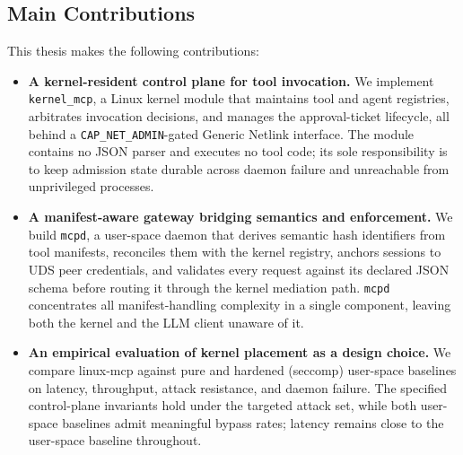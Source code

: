 \subsection{Main Contributions}
This thesis makes the following contributions:
\begin{itemize}
    \item \textbf{A kernel-resident control plane for tool invocation.}
    We implement \texttt{kernel\_\allowbreak mcp}, a Linux kernel module that maintains tool and agent registries, arbitrates invocation decisions, and manages the approval-ticket lifecycle, all behind a \texttt{CAP\_\allowbreak NET\_\allowbreak ADMIN}-gated Generic Netlink interface.
    The module contains no JSON parser and executes no tool code; its sole responsibility is to keep admission state durable across daemon failure and unreachable from unprivileged processes.

    \item \textbf{A manifest-aware gateway bridging semantics and enforcement.}
    We build \texttt{mcpd}, a user-space daemon that derives semantic hash identifiers from tool manifests, reconciles them with the kernel registry, anchors sessions to UDS peer credentials, and validates every request against its declared JSON schema before routing it through the kernel mediation path.
    \texttt{mcpd} concentrates all manifest-handling complexity in a single component, leaving both the kernel and the LLM client unaware of it.

    \item \textbf{An empirical evaluation of kernel placement as a design choice.}
    We compare linux-mcp against pure and hardened (seccomp) user-space baselines on latency, throughput, attack resistance, and daemon failure.
    The specified control-plane invariants hold under the targeted attack set, while both user-space baselines admit meaningful bypass rates; latency remains close to the user-space baseline throughout.
\end{itemize}
